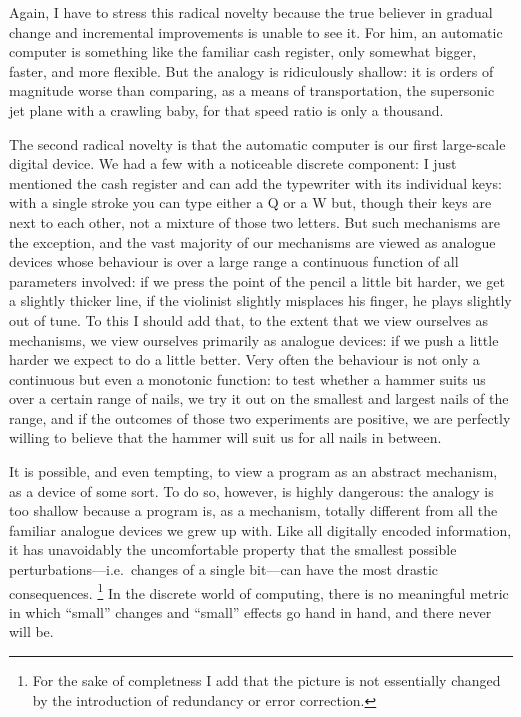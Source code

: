 \documentclass[a4paper,12pt]{article}
\begin{document}
Again, I have to stress this radical novelty because the true believer
in gradual change and incremental improvements is unable to see it.  For
him, an automatic computer is something like the familiar cash register,
only somewhat bigger, faster, and more flexible.  But the analogy is
ridiculously shallow: it is orders of magnitude worse than comparing, as
a means of transportation, the supersonic jet plane with a crawling
baby, for that speed ratio is only a thousand.

The second radical novelty is that the automatic computer is our first
large-scale digital device.  We had a few with a noticeable discrete
component: I just mentioned the cash register and can add the typewriter
with its individual keys: with a single stroke you can type either a Q
or a W but, though their keys are next to each other, not a mixture of
those two letters.  But such mechanisms are the exception, and the vast
majority of our mechanisms are viewed as analogue devices whose
behaviour is over a large range a continuous function of all parameters
involved: if we press the point of the pencil a little bit harder, we
get a slightly thicker line, if the violinist slightly misplaces his
finger, he plays slightly out of tune.  To this I should add that, to
the extent that we view ourselves as mechanisms, we view ourselves
primarily as analogue devices: if we push a little harder we expect to
do a little better.  Very often the behaviour is not only a continuous
but even a monotonic function: to test whether a hammer suits us over a
certain range of nails, we try it out on the smallest and largest nails
of the range, and if the outcomes of those two experiments are positive,
we are perfectly willing to believe that the hammer will suit us for all
nails in between.

It is possible, and even tempting, to view a program as an abstract
mechanism, as a device of some sort.  To do so, however, is highly
dangerous: the analogy is too shallow because a program is, as a
mechanism, totally different from all the familiar analogue devices we
grew up with.  Like all digitally encoded information, it has
unavoidably the uncomfortable property that the smallest possible
perturbations---i.e.\ changes of a single bit---can have the most
drastic consequences.
%
\footnote{For the sake of completness I add that the picture is not
  essentially changed by the introduction of redundancy or error
  correction.}
%
In the discrete world of computing, there is no meaningful metric in
which ``small'' changes and ``small'' effects go hand in hand, and there
never will be.
\end{document}

